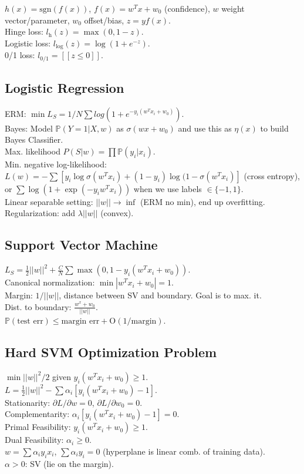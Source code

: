 $h(x) = \text{sgn}(f(x))$, $f(x) = w^T x + w_0$ (confidence), $w$ weight vector/parameter, $w_0$ offset/bias, $z = yf(x)$.\\
Hinge loss: $l_{\text{h}}(z) = \max(0, 1-z)$.\\
Logistic loss: $l_{\log}(z) = \log(1+e^{-z})$.\\
0/1 loss: $l_{\text{0/1}} = [[z \leq 0]]$.

\subsection*{Logistic Regression}

ERM: $\min L_S = 1/N \sum log(1+e^{-y_i(w^T x_i + w_0)})$.\\
Bayes: Model $\mathbb{P}(Y=1|X, w)$ as $\sigma(w x +w_0)$ and use this as $\eta(x)$ to build Bayes Classifier.\\
Max. likelihood $P(S|w) = \prod \mathbb{P}(y_i|x_i)$.\\
Min. negative log-likelihood: $L(w) = -\sum[y_i \log \sigma(w^T x_i) + (1 - y_i) \log(1 - \sigma(w^T x_i)]$ (cross entropy), or $\sum \log(1 + \exp(-y_i w^T x_i))$ when we use labels $\in \{-1, 1\}$.\\
Linear separable setting: $||w|| \rightarrow \inf$ (ERM no min), end up overfitting.\\
Regularization: add $\lambda ||w||$ (convex).

\subsection*{Support Vector Machine}

$L_S = \frac{1}{2}||w||^2 + \frac{C}{N} \sum \max(0, 1-y_i(w^T x_i + w_0))$.\\
Canonical normalization: $\min |w^T x_i + w_0| = 1$.\\
Margin: $1/||w||$, distance between SV and boundary. Goal is to max. it.\\
Dist. to boundary: $\frac{w^x + w_0}{||w||}$.\\
$\mathbb{P}(\text{test err}) \leq \text{margin err} + \text{O}(1/\text{margin})$.

\subsection*{Hard SVM Optimization Problem}

$\min ||w||^2/2$ given $y_i(w^T x_i + w_0) \geq 1$.\\
$L = \frac{1}{2} ||w||^2 - \sum \alpha_i [y_i(w^T x_i + w_0) - 1]$.\\
Stationarity: ${\partial L}/{\partial w}=0$, ${\partial L}/{\partial w_0} = 0$.\\
Complementarity: $\alpha_i [y_i (w^T x_i + w_0) - 1] = 0$.\\
Primal Feasibility: $y_i (w^T x_i + w_0) \geq 1$.\\
Dual Feasibility: $\alpha_i \geq 0$.\\
$w = \sum \alpha_i y_i x_i$, $\sum \alpha_i y_i = 0$ (hyperplane is linear comb. of training data).\\
$\alpha > 0$: SV (lie on the margin).

